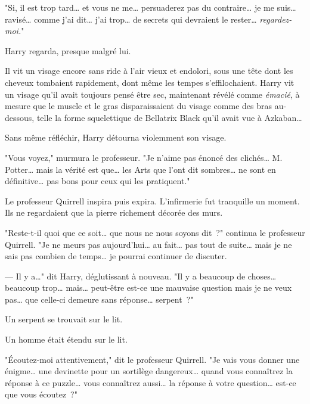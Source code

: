 "Si, il est trop tard… et vous ne me… persuaderez pas du contraire… je me suis… ravisé… comme j'ai dit… j'ai trop… de secrets qui devraient le rester… \emph{regardez-moi.}"

Harry regarda, presque malgré lui.

Il vit un visage encore sans ride à l'air vieux et endolori, sous une tête dont les cheveux tombaient rapidement, dont même les tempes s'effilochaient. Harry vit un visage qu'il avait toujours pensé être sec, maintenant révélé comme \emph{émacié}, à mesure que le muscle et le gras disparaissaient du visage comme des bras au-dessous, telle la forme squelettique de Bellatrix Black qu'il avait vue à Azkaban…

Sans même réfléchir, Harry détourna violemment son visage.

"Vous voyez," murmura le professeur. "Je n'aime pas énoncé des clichés… M. Potter… mais la vérité est que… les Arts que l'ont dit sombres… ne sont en définitive… pas bons pour ceux qui les pratiquent."

Le professeur Quirrell inspira puis expira. L'infirmerie fut tranquille un moment. Ils ne regardaient que la pierre richement décorée des murs.

"Reste-t-il quoi que ce soit… que nous ne nous soyons dit~?" continua le professeur Quirrell. "Je ne meurs pas aujourd'hui… au fait… pas tout de suite… mais je ne sais pas combien de temps… je pourrai continuer de discuter.

--- Il y a…" dit Harry, déglutissant à nouveau. "Il y a beaucoup de choses… beaucoup trop… mais… peut-être est-ce une mauvaise question mais je ne veux pas… que celle-ci demeure sans réponse… serpent~?"

Un serpent se trouvait sur le lit.


Un homme était étendu sur le lit.

"Écoutez-moi attentivement," dit le professeur Quirrell. "Je vais vous donner une énigme… une devinette pour un sortilège dangereux… quand vous connaîtrez la réponse à ce puzzle… vous connaîtrez aussi… la réponse à votre question… est-ce que vous écoutez~?"

